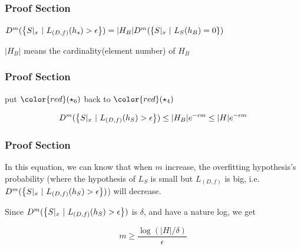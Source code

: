 \begin{frame}
	\frametitle{Proof Section}
	$D^m(\left\{S|_x ~|~L_{(D,f)}(h_s)>\epsilon \right\}) = |H_B|D^m(\left\{{S|_x ~|~L_S(h_B)=0} \right\})$
	
	$|H_B|$ means the cardinality(element number) of $H_B$
	
\end{frame}


\begin{frame}
	\frametitle{Proof Section}
	put $\color{red}(\star_6)$ back to $\color{red}(\star_4)$ 
	
	$$D^m(\left\{S|_x ~|~ L_{(D,f)}(h_S)>\epsilon \right\}) \leq |H_B|e^{-\epsilon m} \leq |H|e^{-\epsilon m}$$
	
\end{frame}


\begin{frame}
	\frametitle{Proof Section}
	In this equation, we can know that when $m$ increase, the  overfitting hypothesis's probability (where the hypothesis of $L_S$ is small but $L_{(D,f)}$ is big, i.e. $D^m(\left\{S|_x ~|~ L_{(D,f)}(h_S)>\epsilon \right\})$) will decrease.
	
\end{frame}

\begin{frame}
	Since $D^m(\left\{S|_x ~|~ L_{(D,f)}(h_S)>\epsilon \right\})$ is $\delta$, and have a nature log, we get

$$m \geq \dfrac{\log(|H|/\delta)}{\epsilon}$$
\end{frame}

 


